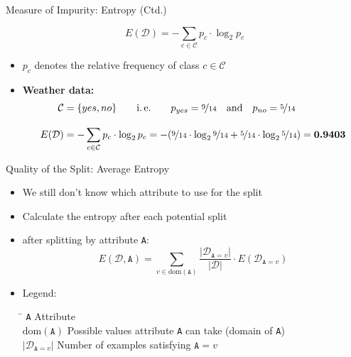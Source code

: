 \begin{frame}{Measure of Impurity: Entropy (Ctd.)}{}
	\begin{boxBlueNoFrame}
		\begin{equation}
			E(\mathcal{D}) = -\sum_{c \in \mathcal{C}} p_c \cdot \log_2 p_c
		\end{equation}
	\end{boxBlueNoFrame}

	\begin{itemize}
		\item $p_c$ denotes the relative frequency of class $c \in \mathcal{C}$	
		\item \textbf{Weather data:}
		\begin{align*}
			\mathcal{C} &= \{ yes, no \} \qquad \text{i.\,e.} \qquad
				p_{yes} = \nicefrac{9}{14} \quad \text{and} \quad p_{no} = \nicefrac{5}{14} \\[3mm]
			E(\mathcal{D})
				&= -\sum_{c \in \mathcal{C}} p_c \cdot \log_2 p_c
	       		   	= - (\nicefrac{9}{14} \cdot \log_2 \nicefrac{9}{14} + \nicefrac{5}{14} \cdot \log_2 \nicefrac{5}{14})
				= \boldsymbol{0.9403}
		\end{align*}
	\end{itemize}
\end{frame}


\begin{frame}{Quality of the Split: Average Entropy}{}
	\begin{itemize}
		\item We still don't know which attribute to use for the split
		\item Calculate the entropy after each potential split
		\item {} after splitting by attribute \texttt{A}:
		\begin{equation}
			E(\mathcal{D}, \texttt{A})
				= \sum_{v \in \text{dom}(\texttt{A})}
					\frac{\vert \mathcal{D}_{\texttt{A}=v} \vert}{\vert \mathcal{D} \vert} \cdot E(\mathcal{D}_{\texttt{A}=v})
		\end{equation}
		\item Legend:
		\footnotesize
		\begin{tabbing}
			\hspace*{2.5cm}\= \kill
			\texttt{A}							\>	Attribute												\\
			$\text{dom}(\texttt{A})$				\>	Possible values attribute \texttt{A} can take (domain of \texttt{A})	\\
			$\vert \mathcal{D}_{\texttt{A}=v} \vert$	\>	Number of examples satisfying $\texttt{A} = v$
		\end{tabbing}
		\normalsize
	\end{itemize}
\end{frame}


